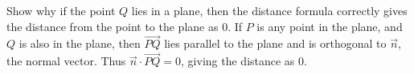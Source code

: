 {Show why if the point $Q$ lies in a plane, then the distance formula correctly gives the distance from the point to the plane as $0$.
}
{If $P$ is any point in the plane, and $Q$ is also in the plane, then $\overrightarrow{PQ}$ lies parallel to the plane and is orthogonal to $\vec n$, the normal vector. Thus $\vec n\cdot \overrightarrow{PQ}=0$, giving the distance as 0.
}